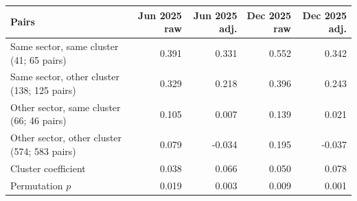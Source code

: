 \begin{tabularx}{\linewidth}{@{}>{\raggedright\arraybackslash}X r r r r@{}}
\toprule
Pairs & Jun 2025 raw & Jun 2025 adj. & Dec 2025 raw & Dec 2025 adj. \\
\midrule
Same sector, same cluster (41; 65 pairs) & 0.391 & 0.331 & 0.552 & 0.342 \\
Same sector, other cluster (138; 125 pairs) & 0.329 & 0.218 & 0.396 & 0.243 \\
Other sector, same cluster (66; 46 pairs) & 0.105 & 0.007 & 0.139 & 0.021 \\
Other sector, other cluster (574; 583 pairs) & 0.079 & -0.034 & 0.195 & -0.037 \\
\midrule
Cluster coefficient & 0.038 & 0.066 & 0.050 & 0.078 \\
Permutation $p$ & 0.019 & 0.003 & 0.009 & 0.001 \\
\bottomrule
\end{tabularx}
